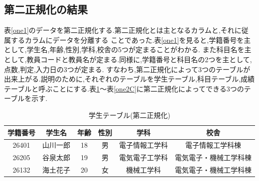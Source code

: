 \documentclass[a4j]{jarticle}
\begin{document}
    \subsection{第二正規化の結果}
    表\ref{one1}のデータを第二正規化する.第二正規化とは主となるカラムと,それに従属するカラムにデータを分離する
    ことであった.表\ref{one1}を見ると,学籍番号を主として,学生名,年齢,性別,学科,校舎の5つが定まることがわかる.
    また科目名を主として,教員コードと教員名が定まる.同様に,学籍番号と科目名の2つを主として,点数,判定,入力日の3つが定まる.
    すなわち,第二正規化によって3つのテーブルが出来上がる.説明のために,それぞれのテーブルを学生テーブル,科目テーブル,成績
    テーブルと呼ぶことにする.表\ref{one2A}～表\ref{one2C}に第二正規化によってできる3つのテーブルを示す.
    \begin{table}[H]
      \caption{学生テーブル(第二正規化)}
      \label{one2A}
      \begin{center}
        \begin{tabular}{c|c|c|c|c|c}\hline
          学籍番号 & 学生名 & 年齢 & 性別 & 学科 & 校舎 \\ \hline \hline
          26401 & 山川一郎 & 18 & 男 & 電子情報工学科 & 電子情報工学科棟 \\ \hline
          26205 & 谷泉太郎 & 19 & 男 & 電気電子工学科 & 電気電子・機械工学科棟 \\ \hline
          26132 & 海土花子 & 20 & 女 & 機械工学科 & 電気電子・機械工学科棟 \\ \hline
        \end{tabular}
      \end{center}
      \end{table}
\end{document}
